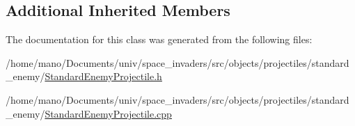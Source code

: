 \subsection*{Additional Inherited Members}


The documentation for this class was generated from the following files\+:\begin{DoxyCompactItemize}
\item 
/home/mano/\+Documents/univ/space\+\_\+invaders/src/objects/projectiles/standard\+\_\+enemy/\hyperlink{StandardEnemyProjectile_8h}{Standard\+Enemy\+Projectile.\+h}\item
/home/mano/\+Documents/univ/space\+\_\+invaders/src/objects/projectiles/standard\+\_\+enemy/\hyperlink{StandardEnemyProjectile_8cpp}{Standard\+Enemy\+Projectile.\+cpp}\end{DoxyCompactItemize}
